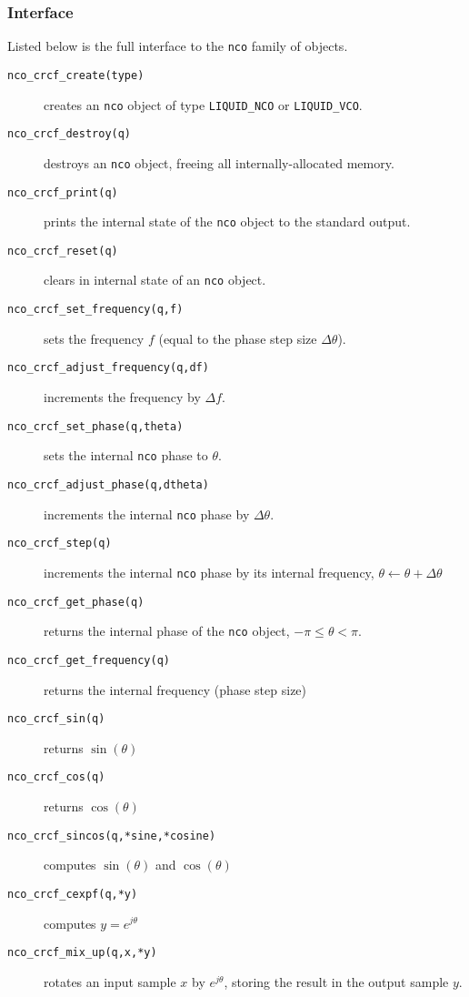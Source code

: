 \subsubsection{Interface}
\label{module:nco:nco:interface}
%
Listed below is the full interface to the {\tt nco} family of objects.
%
\begin{description}
\item[{\tt nco\_crcf\_create(type)}]
    creates an {\tt nco} object of type
    {\tt LIQUID\_NCO} or 
    {\tt LIQUID\_VCO}.
\item[{\tt nco\_crcf\_destroy(q)}]
    destroys an {\tt nco} object, freeing all internally-allocated
    memory.
\item[{\tt nco\_crcf\_print(q)}]
    prints the internal state of the {\tt nco} object to the standard
    output.
\item[{\tt nco\_crcf\_reset(q)}]
    clears in internal state of an {\tt nco} object.
\item[{\tt nco\_crcf\_set\_frequency(q,f)}]
    sets the frequency $f$ (equal to the phase step size
    $\Delta\theta$).
\item[{\tt nco\_crcf\_adjust\_frequency(q,df)}]
    increments the frequency by $\Delta f$.
\item[{\tt nco\_crcf\_set\_phase(q,theta)}]
    sets the internal {\tt nco} phase to $\theta$.
\item[{\tt nco\_crcf\_adjust\_phase(q,dtheta)}]
    increments the internal {\tt nco} phase by $\Delta\theta$.
\item[{\tt nco\_crcf\_step(q)}]
    increments the internal {\tt nco} phase by its
    internal frequency, $\theta \leftarrow \theta + \Delta\theta$
\item[{\tt nco\_crcf\_get\_phase(q)}]
    returns the internal phase of the {\tt nco} object,
    $-\pi \leq \theta < \pi$.
\item[{\tt nco\_crcf\_get\_frequency(q)}]
    returns the internal frequency (phase step size)
\item[{\tt nco\_crcf\_sin(q)}] returns $\sin(\theta)$
\item[{\tt nco\_crcf\_cos(q)}] returns $\cos(\theta)$
\item[{\tt nco\_crcf\_sincos(q,*sine,*cosine)}]
    computes $\sin(\theta)$ and $\cos(\theta)$
\item[{\tt nco\_crcf\_cexpf(q,*y)}] computes $y=e^{j\theta}$
\item[{\tt nco\_crcf\_mix\_up(q,x,*y)}]
    rotates an input sample $x$ by $e^{j\theta}$, storing the result in
    the output sample $y$.

\end{description}
